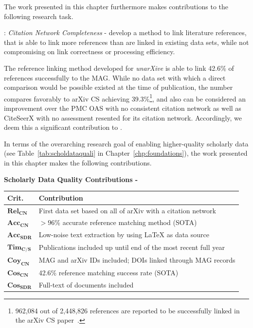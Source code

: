 The work presented in this chapter furthermore makes contributions to the following research task.

\begin{rtlist}
    \item[\rtmark{2}:] \textit{Citation Network Completeness} - develop a method to link literature references, that is able to link more references than are linked in existing data sets, while not compromising on link correctness or processing efficiency.
\end{rtlist}


The reference linking method developed for \emph{unarXive} is able to link 42.6\% of references successfully to the MAG. While no data set with which a direct comparison would be possible existed at the time of publication, the number compares favorably to arXiv CS achieving 39.3\%\footnote{962,084 out of 2,448,826 references are reported to be successfully linked in the arXiv CS paper~\cite{Faerber2018LREC}.}, and also can be considered an improvement over the PMC OAS with no consistent citation network as well as CiteSeerX with no assessment resented for its citation network. Accordingly, we deem this a significant contribution to .

In terms of the overarching research goal of enabling higher-quality scholarly data (see Table~\ref{tab:scholdataquali} in Chapter~\ref{chp:foundations}), the work presented in this chapter makes the following contributions.

\begin{infobox-progress}
      \textbf{Scholarly Data Quality Contributions - \cite{Saier2020}}\vspace{0.5em}

      \begin{tabular}{lp{10.9cm}}
        \toprule
        Crit. & Contribution \\
        \midrule
        $\mathbf{Rel_{CN}}$ & First data set based on all of arXiv with a citation network \\
        $\mathbf{Acc_{CN}}$ & $>96$\% accurate reference matching method (SOTA) \\
        $\mathbf{Acc_{SDR}}$ & Low-noise text extraction by using \LaTeX{} as data source \\
        $\mathbf{Tim_{C/S}}$ & Publications included up until end of the most recent full year \\
        $\mathbf{Coy_{CN}}$ & MAG and arXiv IDs included; DOIs linked through MAG records \\
        $\mathbf{Cos_{CN}}$ & 42.6\% reference matching success rate (SOTA) \\
        $\mathbf{Cos_{SDR}}$ & Full-text of documents included \\
        \bottomrule
      \end{tabular}
\end{infobox-progress}

